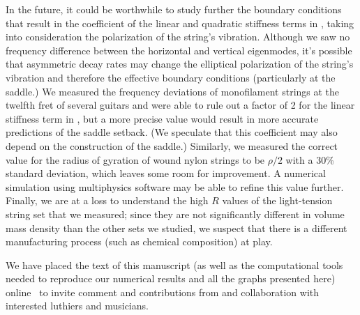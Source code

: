 In the future, it could be worthwhile to study further the boundary conditions that result in the coefficient of the linear and quadratic stiffness terms in , taking into consideration the polarization of the string's vibration. Although we saw no frequency difference between the horizontal and vertical eigenmodes, it's possible that asymmetric decay rates may change the elliptical polarization of the string's vibration and therefore the effective boundary conditions (particularly at the saddle.) We measured the frequency deviations of monofilament strings at the twelfth fret of several guitars and were able to rule out a factor of 2 for the linear stiffness term in , but a more precise value would result in more accurate predictions of the saddle setback. (We speculate that this coefficient may also depend on the construction of the saddle.) Similarly, we measured the correct value for the radius of gyration of wound nylon strings to be $\rho/2$ with a 30\% standard deviation, which leaves some room for improvement. A numerical simulation using multiphysics software may be able to refine this value further. Finally, we are at a loss to understand the high $R$ values of the light-tension string set that we measured; since they are not significantly different in volume mass density than the other sets we studied, we suspect that there is a different manufacturing process (such as chemical composition) at play.

We have placed the text of this manuscript (as well as the computational tools needed to reproduce our numerical results and all the graphs presented here) online~\cite{ref:github2024rgb} to invite comment and contributions from and collaboration with interested luthiers and musicians.